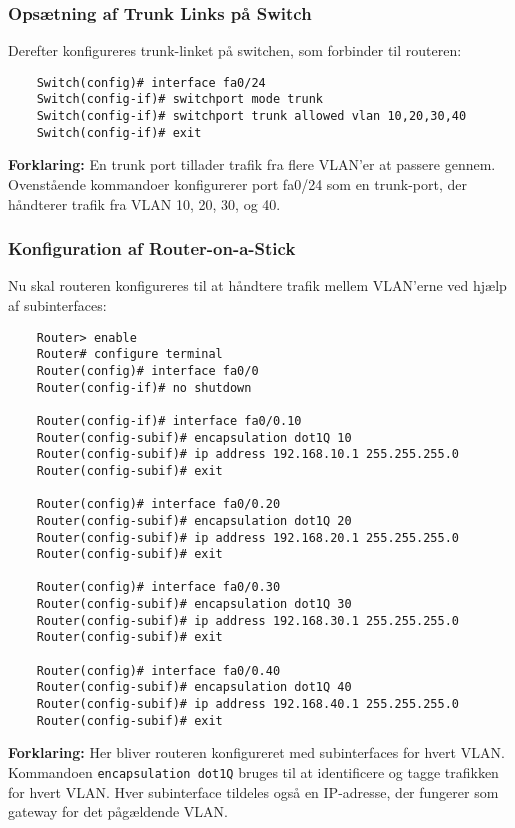 \subsubsection{Opsætning af Trunk Links på Switch}
Derefter konfigureres trunk-linket på switchen, som forbinder til routeren:

\begin{verbatim}
	Switch(config)# interface fa0/24
	Switch(config-if)# switchport mode trunk
	Switch(config-if)# switchport trunk allowed vlan 10,20,30,40
	Switch(config-if)# exit
\end{verbatim}

\noindent\textbf{Forklaring:} En trunk port tillader trafik fra flere VLAN'er at passere gennem. Ovenstående kommandoer konfigurerer port fa0/24 som en trunk-port, der håndterer trafik fra VLAN 10, 20, 30, og 40.

\subsubsection{Konfiguration af Router-on-a-Stick}
Nu skal routeren konfigureres til at håndtere trafik mellem VLAN'erne ved hjælp af subinterfaces:

\begin{verbatim}
	Router> enable
	Router# configure terminal
	Router(config)# interface fa0/0
	Router(config-if)# no shutdown
	
	Router(config-if)# interface fa0/0.10
	Router(config-subif)# encapsulation dot1Q 10
	Router(config-subif)# ip address 192.168.10.1 255.255.255.0
	Router(config-subif)# exit
	
	Router(config)# interface fa0/0.20
	Router(config-subif)# encapsulation dot1Q 20
	Router(config-subif)# ip address 192.168.20.1 255.255.255.0
	Router(config-subif)# exit
	
	Router(config)# interface fa0/0.30
	Router(config-subif)# encapsulation dot1Q 30
	Router(config-subif)# ip address 192.168.30.1 255.255.255.0
	Router(config-subif)# exit
	
	Router(config)# interface fa0/0.40
	Router(config-subif)# encapsulation dot1Q 40
	Router(config-subif)# ip address 192.168.40.1 255.255.255.0
	Router(config-subif)# exit
\end{verbatim}

\noindent\textbf{Forklaring:} Her bliver routeren konfigureret med subinterfaces for hvert VLAN. Kommandoen \texttt{encapsulation dot1Q} bruges til at identificere og tagge trafikken for hvert VLAN. Hver subinterface tildeles også en IP-adresse, der fungerer som gateway for det pågældende VLAN.

